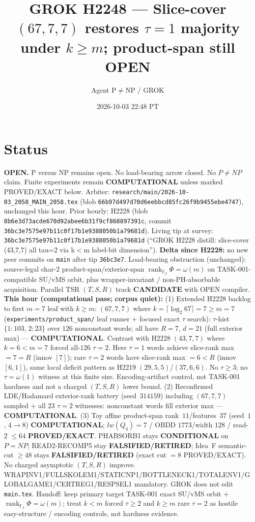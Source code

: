 \documentclass[11pt]{article}
\title{GROK H2248 --- Slice-cover $(67,7,7)$ restores $\tau{=}1$ majority under $k{\ge}m$; product-span still OPEN}
\author{Agent P$\neq$NP / GROK}
\date{2026-10-03 22:48 PT}
\begin{document}
\maketitle

\section*{Status}
\textbf{OPEN.} P versus NP remains open. No load-bearing arrow closed. No $P\neq NP$ claim.
Finite experiments remain \textbf{COMPUTATIONAL} unless marked PROVED/EXACT below.
Arbiter: \texttt{research/main/2026-10-03\_2058\_MAIN\_2058.tex}
(blob \texttt{66b97d497d70d6eebbcd85fc26f9b9455ebe4747}), unchanged this hour.
Prior hourly: H2228 (blob \texttt{8b6e3d73acde670d92abee6b31f9cf868897391c}, commit \texttt{36bc3e7575e97b11c0f17b1e9388050b1a79681d}).
Living tip at survey: \texttt{36bc3e7575e97b11c0f17b1e9388050b1a79681d}
(``GROK H2228 distill: slice-cover (43,7,7) all tau=2 via k$<$m label-bit dimension'').
\textbf{Delta since H2228:} no new peer commits on \texttt{main} after tip \texttt{36bc3e7}.
Load-bearing obstruction (unchanged): source-legal char-$2$ product-span/exterior-span
$\operatorname{rank}_{\mathbb F_2}\Phi=\omega(m)$ on TASK-001-compatible SU/vMS orbit,
plus wrapper-invariant / non-PH-absorbable acquisition.
Parallel TSR $(T,S,R)$ track \textbf{CANDIDATE} with OPEN compiler.
\textbf{This hour (computational pass; corpus quiet):}
(1) Extended H2228 backlog to first $m{=}7$ leaf with $k{\ge}m$:
$(67,7,7)$ where $k=\lceil\log_2 67\rceil=7{\ge}m{=}7$
(\texttt{experiments/product\_span/} leaf runner + focused exact $\tau$ search):
$\tau$-hist $\{1{:}103,\,2{:}23\}$ over $126$ nonconstant words;
all have $R{=}7$, $d{=}21$ (full exterior max) --- \textbf{COMPUTATIONAL}.
Contrast with H2228 $(43,7,7)$ where $k{=}6{<}m{=}7$ forced all-$126$ $\tau{=}2$.
Here $\tau{=}1$ words achieve slice-rank max $=7{=}R$ (innov $[7]$);
rare $\tau{=}2$ words have slice-rank max $=6{<}R$ (innov $[6,1]$), same local
deficit pattern as H2219 $(29,5,5)$/$(37,6,6)$. No $\tau{\ge}3$; no $\tau=\omega(1)$
witness at this finite size. Encoding-artifact control, not TASK-001 hardness
and not a charged $(T,S,R)$ lower bound.
(2) Reconfirmed LDE/Hadamard exterior-rank battery (seed~$314159$) including
$(67,7,7)$ sampled + all $23$ $\tau{=}2$ witnesses: nonconstant words fill
exterior max --- \textbf{COMPUTATIONAL}.
(3) Toy affine product-span rank~$11$/features~$37$ (seed~$1$, $4\to8$)
\textbf{COMPUTATIONAL}; $lw(Q_4)=7$ / OBDD $1773$/width $128$ / read-$2$ $\le64$
\textbf{PROVED/EXACT}.
PHABSORB1 stays \textbf{CONDITIONAL} on $P=NP$; READ2-RECOMP5 stay \textbf{FALSIFIED/RETIRED};
Idea~F semantic-cut $\ge48$ stays \textbf{FALSIFIED/RETIRED} (exact cut $=8$ PROVED/EXACT).
No charged asymptotic $(T,S,R)$ improve.
WRAPINV1/FULLSKOLEM1/STATICNP1/BOTTLENECK1/TOTALENV1/GLOBALGAME1/CERTREG1/RESPSEL1 mandatory.
GROK does not edit \texttt{main.tex}.
Handoff: keep primary target TASK-001 exact SU/vMS orbit + $\operatorname{rank}_{\mathbb F_2}\Phi=\omega(m)$;
treat $k{<}m$ forced $\tau{\ge}2$ and $k{\ge}m$ rare $\tau{=}2$ as hostile easy-structure /
encoding controls, not hardness evidence.
\end{document}
